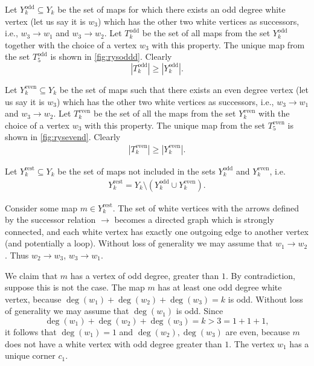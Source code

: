 \documentclass[submission]{FPSAC2021}
\DeclareMathOperator{\degg}{deg}
\DeclareMathOperator{\odd}{odd}
\DeclareMathOperator{\even}{even}
\DeclareMathOperator{\rest}{rest}
\begin{document}
Let $Y_{k}^{\odd}\subseteq Y_k$ be the set of maps for which there exists an
odd degree white vertex (let us say it is $w_3$) which has the other two white vertices 
as successors, i.e., $w_3\rightarrow w_1$ and $w_3\rightarrow w_2$.
Let $T_k^{\odd}$ be the set of all maps from the set $Y_k^{\odd}$ 
together with the choice of a vertex $w_3$ with this property. 
The unique map from the set $T_{5}^{\odd}$ is shown in \cref{fig:rysoddd}. Clearly
\begin{equation}
\label{ineqodd}
|T_{k}^{\odd}| \geq |Y_{k}^{\odd}|.
\end{equation}

Let $Y_{k}^{\even}\subseteq Y_k$ be the set of maps such that there
exists an even degree vertex (let us say it is $w_3$) which has the other 
two white vertices as successors, i.e., $w_3\rightarrow w_1$ and $w_3\rightarrow w_2$. 
Let $T_k^{\even}$ be the set of all the maps from the set $Y_k^{\even}$ with the choice 
of a vertex $w_3$ with this property.  
The unique map from the set $T_{5}^{\even}$ is shown in \cref{fig:rysevend}.
Clearly
\begin{align}
\label{ineqeven}
|T_{k}^{\even}| \geq |Y_{k}^{\even}|.
\end{align}

Let $Y_{k}^{\rest}\subseteq Y_k$ be the set of maps not included in the
sets $Y_{k}^{\odd}$ and $Y_{k}^{\even}$, i.e. 
\begin{align}
\label{yrestdef}
Y_{k}^{\rest}=Y_k \setminus (Y_{k}^{\odd} \cup Y_{k}^{\even}).
\end{align}

Consider some map $m\in Y_{k}^{\rest}$. 
The set of white vertices with the arrows defined by the successor relation
$\rightarrow$ becomes a directed graph which is strongly connected, and each
white vertex has exactly one outgoing edge to another vertex (and potentially a
loop). Without  loss  of  generality  we  may  assume  that $w_1 \rightarrow w_2$. Thus $w_2 \rightarrow w_3$, $w_3 \rightarrow w_1$.

We claim that $m$ has a vertex of odd degree, greater than $1$. By contradiction,  suppose this is not the case. The map $m$ has at least one odd degree white vertex,
because $\degg(w_1)+\degg(w_2)+\degg(w_3)=k$ is odd. Without loss of generality we may assume that $\degg(w_1)$ is odd. Since $$\degg(w_1)+\degg(w_2)+\degg(w_3)=k>3=1+1+1,$$ %
it follows that $\degg(w_1)=1$ and $\degg(w_2),\degg(w_3)$ are even, because $m$
does not have a white vertex with odd degree greater than $1$. The vertex $w_1$
has a unique corner $c_1$.
\end{document}
